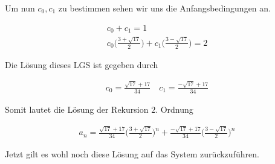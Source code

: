 \begin{solution}
  Um nun $c_0, c_1$ zu bestimmen sehen wir uns die Anfangsbedingungen an.

  \begin{align*}
    c_0 + c_1 = 1 \\
    c_0 \Big(\frac{3 +\sqrt{17}}{2}\Big) + c_1\Big(\frac{3 -\sqrt{17}}{2}\Big) = 2
  \end{align*}

  Die Lösung dieses LGS ist gegeben durch

  \begin{align*}
    c_0 = \frac{\sqrt{17} + 17}{34} \quad
    c_1 = \frac{-\sqrt{17} +17}{34}
  \end{align*}

  Somit lautet die Lösung der Rekursion $2.$ Ordnung

  \begin{align*}
  a_n
  =
  \frac{\sqrt{17} + 17}{34} \Big(\frac{3 +\sqrt{17}}{2}\Big)^n
    + \frac{-\sqrt{17} +17}{34} \Big(\frac{3 -\sqrt{17}}{2}\Big)^n
  \end{align*}

  Jetzt gilt es wohl noch diese Lösung auf das System zurückzuführen.
\end{solution}

